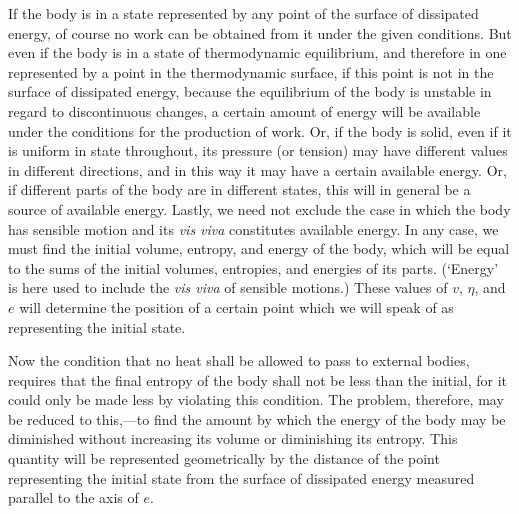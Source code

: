 \documentclass[11pt]{article}
\newcommand{\visviva}{\emph{vis viva}}
\begin{document}
If the body is in a state represented by any point of the surface of dissipated energy, of course no work can be obtained from it under the given conditions. But even if the body is in a state of thermodynamic equilibrium, and therefore in one represented by a point in the thermodynamic surface, if this point is not in the surface of dissipated energy, because the equilibrium of the body is unstable in regard to discontinuous changes, a certain amount of energy will be available under the conditions for the production of work. Or, if the body is solid, even if it is uniform in state throughout, its pressure (or tension) may have different values in different directions, and in this way it may have a certain available energy. Or, if different parts of the body are in different states, this will in general be a source of available energy. Lastly, we need not exclude the case in which the body has sensible motion and its \visviva{} constitutes available energy. In any case, we must find the initial volume, entropy, and energy of the body, which will be equal to the sums of the initial volumes, entropies, and energies of its parts. (`Energy' is here used to include the \visviva{} of sensible motions.) These values of $v$, $\eta$, and $e$ will determine the position of a certain point which we will speak of as representing the initial state.

Now the condition that no heat shall be allowed to pass to external bodies, requires that the final entropy of the body shall not be less than the initial, for it could only be made less by violating this condition. The problem, therefore, may be reduced to this,---to find the amount by which the energy of the body may be diminished without increasing its volume or diminishing its entropy. This quantity will be represented geometrically by the distance of the point representing the initial state from the surface of dissipated energy measured parallel to the axis of $e$.
\end{document}
